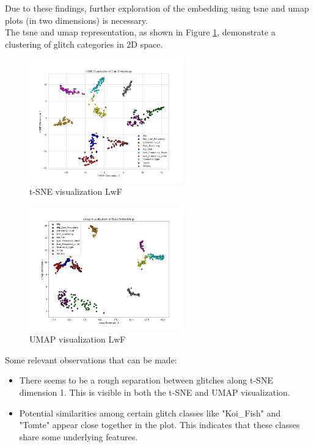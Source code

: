 Due to these findings, further exploration of the embedding using \acrshort{tsne} and \acrshort{umap} plots (in two dimensions) is necessary.\\ The \acrshort{tsne} and \acrshort{umap} representation, as shown in Figure \ref{fig:tSNE_LwF}, demonstrate a clustering of glitch categories in 2D space.


\begin{figure}[ht]
\centering
    \centering
    \includegraphics[width=0.6\textwidth]{Images/tSNE_LwF_MultiView_testset_100epochs.png}
    \caption{t-SNE visualization LwF}
    \label{fig:tSNE_LwF}
\end{figure}

\begin{figure}[ht]
  \centering
    \includegraphics[width=0.6\textwidth]{Images/umap_MultiView_LwF_testset_100epochs.png}
    \caption{UMAP visualization LwF}
    \label{fig:umap_LwF}
\end{figure}


Some relevant observations that can be made: 
\begin{itemize}
    \item There seems to be a rough separation between glitches along t-SNE dimension 1. This is visible in both the t-SNE and UMAP visualization.  
    \item Potential similarities among certain glitch classes like "Koi\_Fish" and "Tomte" appear close together in the plot. This indicates that these classes share some underlying features. 
\end{itemize}

